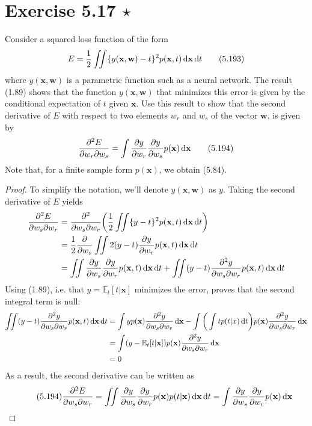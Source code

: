 \section*{Exercise 5.17 $\star$}
Consider a squared loss function of the form
\begin{equation*}
    E = \frac{1}{2} \iint \{y(\mathbf{x}, \mathbf{w}) - t\}^2 
    p(\mathbf{x}, t) \mathop{}\!\mathrm{d} \mathbf{x} \mathop{}\!\mathrm{d} t
    \tag{5.193}\label{eq:5.193}
\end{equation*}
where $y(\mathbf{x}, \mathbf{w})$ is a parametric function such as a neural
network. The result (1.89) shows that the function $y(\mathbf{x}, \mathbf{w})$
that minimizes this error is given by the conditional
expectation of $t$ given $\mathbf{x}$. Use this result to show
that the second derivative of $E$ with respect to two elements
$w_r$ and $w_s$ of the vector $\mathbf{w}$, is given by
\begin{equation*}
    \pdv{E}{w_r}{w_s} = \int \pdv{y}{w_r} \pdv{y}{w_s} p(\mathbf{x}) \mathop{}\!\mathrm{d} \mathbf{x}
    \tag{5.194}\label{eq:5.194}
\end{equation*}
Note that, for a finite sample form $p(\mathbf{x})$, we obtain
(5.84).

\vspace{1em}

\begin{proof}
    To simplify the notation, we'll denote $y(\mathbf{x}, \mathbf{w})$ as $y$.
    Taking the second derivative of $E$ yields
    \begin{align*}
         \pdv{E}{w_s}{w_r}
         &= \pdv{}{w_s}{w_r} \bigg(\frac{1}{2} \iint \{y - t\}^2 p(\mathbf{x}, t) \diff \mathbf{x} \diff t\bigg) \\
         &= \frac{1}{2} \pdv{w_s} \iint 2(y - t) \pdv{y}{w_r} p(\mathbf{x}, t) \diff \mathbf{x} \diff t \\
         &= \iint \pdv{y}{w_s} \pdv{y}{w_r} p(\mathbf{x}, t) \diff \mathbf{x} \diff t + 
         \iint (y - t)\pdv{y}{w_s}{w_r} p(\mathbf{x}, t) \diff \mathbf{x} \diff t
    \end{align*}
    Using (1.89), i.e. that $y = \mathbb{E}_t[t | \mathbf{x}]$
    minimizes the error, proves that the second integral term is null:
    \begin{align*}
         \iint (y - t)\pdv{y}{w_s}{w_r} p(\mathbf{x}, t) \mathop{}\!\mathrm{d} \mathbf{x} \mathop{}\!\mathrm{d} t
         &= \int y p(\mathbf{x}) \pdv{y}{w_s}{w_r} \mathop{}\!\mathrm{d} \mathbf{x}
         - \int \bigg(\int t p(t | x) \mathop{}\!\mathrm{d} t\bigg) p(\mathbf{x}) \pdv{y}{w_s}{w_r} \mathop{}\!\mathrm{d} \mathbf{x} \\
         &= \int (y - \mathbb{E}_t[t | \mathbf{x}]) p(\mathbf{x}) \pdv{y}{w_s}{w_r} \mathop{}\!\mathrm{d} \mathbf{x} \\
         &= 0
    \end{align*}
    As a result, the second derivative can be written as
    \begin{equation*} \tag{5.194}
        \pdv{E}{w_s}{w_r}
        = \iint \pdv{y}{w_s} \pdv{y}{w_r} p(\mathbf{x}) p(t | \mathbf{x}) \mathop{}\!\mathrm{d} \mathbf{x} \mathop{}\!\mathrm{d} t
        = \int  \pdv{y}{w_s} \pdv{y}{w_r} p(\mathbf{x}) \mathop{}\!\mathrm{d} \mathbf{x}
    \end{equation*}
\end{proof}

